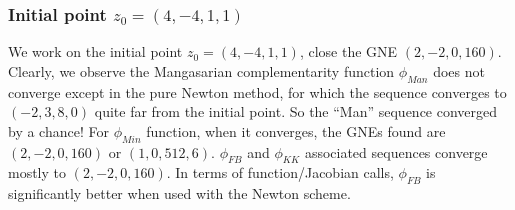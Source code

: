\documentclass[11pt]{article}
\newcommand{\code}{\texttt}
\begin{document}
%
%


\subsubsection{Initial point $z_0 = (4, -4,  1,  1)$}

We work on the initial point $z_0 = (4, -4,  1,  1)$, close the GNE  $(2, -2, 0, 160)$.
Clearly, we observe the Mangasarian complementarity function $\phi_{Man}$ does not converge except in the pure Newton method, for which the sequence converges to $(-2, 3, 8, 0)$ quite far from the initial point. So the ``Man'' sequence converged by a chance! For $\phi_{Min}$ function, when it converges, the GNEs found are $(2, -2, 0, 160)$ or $(1, 0, 512, 6)$. $\phi_{FB}$ and $\phi_{KK}$ associated sequences converge mostly to  $(2, -2, 0, 160)$. In terms of function/Jacobian calls, $\phi_{FB}$ is significantly better when used with the Newton scheme. 
\end{document}
